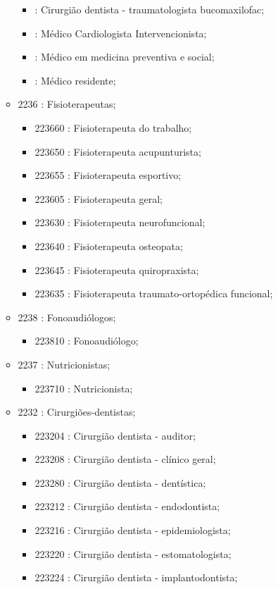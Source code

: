 \begin{itemize}
\begin{itemize}
\begin{itemize}
      \item  : Cirurgião dentista - traumatologista bucomaxilofac;
      \item  : Médico Cardiologista Intervencionista;
      \item  : Médico em medicina preventiva e social;
      \item  : Médico residente;
    \end{itemize}
    \item 2236 : Fisioterapeutas;
    \begin{itemize}
      \item 223660 : Fisioterapeuta do trabalho;
      \item 223650 : Fisioterapeuta acupunturista;
      \item 223655 : Fisioterapeuta esportivo;
      \item 223605 : Fisioterapeuta geral;
      \item 223630 : Fisioterapeuta neurofuncional;
      \item 223640 : Fisioterapeuta osteopata;
      \item 223645 : Fisioterapeuta quiropraxista;
      \item 223635 : Fisioterapeuta traumato-ortopédica funcional;
    \end{itemize}
    \item 2238 : Fonoaudiólogos;
    \begin{itemize}
      \item 223810 : Fonoaudiólogo;
    \end{itemize}
    \item 2237 : Nutricionistas;
    \begin{itemize}
      \item 223710 : Nutricionista;
    \end{itemize}
    \item 2232 : Cirurgiões-dentistas;
    \begin{itemize}
      \item 223204 : Cirurgião dentista - auditor;
      \item 223208 : Cirurgião dentista - clínico geral;
      \item 223280 : Cirurgião dentista - dentística;
      \item 223212 : Cirurgião dentista - endodontista;
      \item 223216 : Cirurgião dentista - epidemiologista;
      \item 223220 : Cirurgião dentista - estomatologista;
      \item 223224 : Cirurgião dentista - implantodontista;

\end{itemize}
\end{itemize}
\end{itemize}
